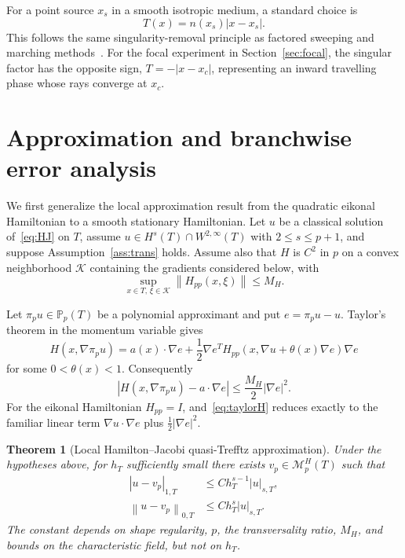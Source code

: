 \documentclass[preprint,12pt]{elsarticle}
\newtheorem{theorem}{Theorem}[section]
\newcommand{\PP}{\mathbb P}
\newcommand{\grad}{\nabla}
\newcommand{\norm}[1]{\left\lVert #1\right\rVert}
\newcommand{\abs}[1]{\left\lvert #1\right\rvert}
\begin{document}
For a point source $x_s$ in a smooth isotropic medium, a standard choice is
\[
  T(x)=n(x_s)\abs{x-x_s}.
\]
This follows the same singularity-removal principle as factored sweeping and marching methods~\cite{FomelLuoZhao2009,TreisterHaber2016}.  For the focal experiment in Section~\ref{sec:focal}, the singular factor has the opposite sign, $T=-\abs{x-x_c}$, representing an inward travelling phase whose rays converge at $x_c$.

\section{Approximation and branchwise error analysis}\label{sec:approx}
We first generalize the local approximation result from the quadratic eikonal Hamiltonian to a smooth stationary Hamiltonian.  Let $u$ be a classical solution of~\eqref{eq:HJ} on $T$, assume $u\in H^s(T)\cap W^{2,\infty}(T)$ with $2\le s\le p+1$, and suppose Assumption~\ref{ass:trans} holds.  Assume also that $H$ is $C^2$ in $p$ on a convex neighborhood $\mathcal K$ containing the gradients considered below, with
\begin{equation}\label{eq:Hppbound}
 \sup_{x\in T,\,\xi\in\mathcal K}\norm{H_{pp}(x,\xi)}\le M_H.
\end{equation}

Let $\pi_pu\in\PP_p(T)$ be a polynomial approximant and put $e=\pi_pu-u$.  Taylor's theorem in the momentum variable gives
\begin{equation}\label{eq:taylorH}
 H(x,\grad\pi_pu)
 =a(x)\cdot\grad e
 +\frac12\grad e^T
 H_{pp}(x,\grad u+\theta(x)\grad e)\grad e
\end{equation}
for some $0<\theta(x)<1$.  Consequently
\begin{equation}\label{eq:remainderH}
 \abs{H(x,\grad\pi_pu)-a\cdot\grad e}
 \le \frac{M_H}{2}\abs{\grad e}^2.
\end{equation}
For the eikonal Hamiltonian $H_{pp}=I$, and~\eqref{eq:taylorH} reduces exactly to the familiar linear term $\grad u\cdot\grad e$ plus $\tfrac12|\grad e|^2$.

\begin{theorem}[Local Hamilton--Jacobi quasi-Trefftz approximation]\label{thm:approx}
Under the hypotheses above, for $h_T$ sufficiently small there exists $v_p\in\mathcal M_p^H(T)$ such that
\begin{align}
 \abs{u-v_p}_{1,T}&\le C h_T^{s-1}\abs{u}_{s,T},\label{eq:H1approx}\\
 \norm{u-v_p}_{0,T}&\le C h_T^s\abs{u}_{s,T}.\label{eq:L2approx}
\end{align}
The constant depends on shape regularity, $p$, the transversality ratio, $M_H$, and bounds on the characteristic field, but not on $h_T$.
\end{theorem}
\end{document}
